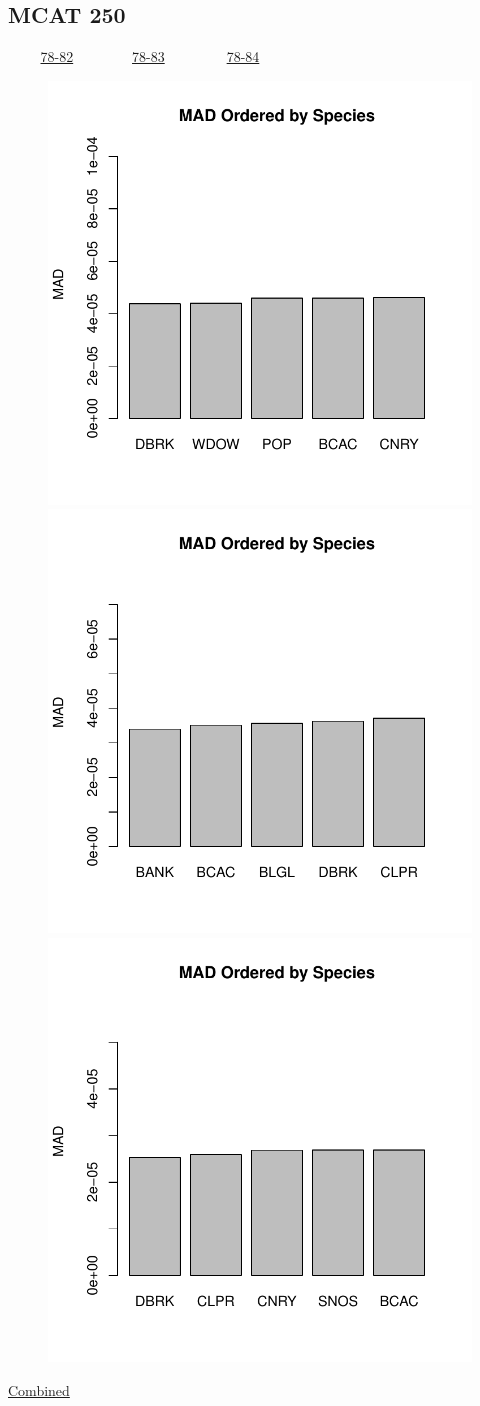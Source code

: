 \documentclass[ xcolor = pdftex, dvipsnames, table ]{beamer}
\begin{document}
%
%

\subsection{MCAT 250}
\begin{frame}{$~~~~~~~~~$ \href{https://github.com/gasduster99/sppComp/tree/master/sscRuns/25019781982M4}{78-82} $~~~~~~~~~~~~~~~~$ \href{https://github.com/gasduster99/sppComp/tree/master/sscRuns/25019781983M4}{78-83} $~~~~~~~~~~~~~~~~~$ \href{https://github.com/gasduster99/sppComp/tree/master/sscRuns/25019781984M4}{78-84} }	
	\begin{figure}[ht!]
        \centering
	\hspace*{-1cm}
        \includegraphics[width=.4\textwidth]{../sscRuns/25019781982M4/sppHeadMad68.pdf}
        \includegraphics[width=.4\textwidth]{../sscRuns/25019781983M4/sppHeadMad68.pdf}
	\includegraphics[width=.4\textwidth]{../sscRuns/25019781984M4/sppHeadMad68.pdf}
	\end{figure}
	\vspace{-1cm}
	\begin{center}
	\Large
	\href{https://github.com/gasduster99/sppComp/tree/master/try1/postSSC/25019781982345M4}{Combined}
	\end{center}
\end{frame}
\end{document}
